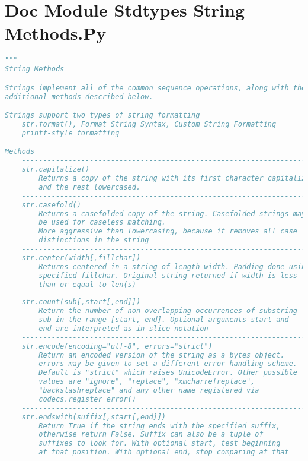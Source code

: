 \documentclass[a4paper,landscape]{report}
\begin{document}
\section{Doc Module Stdtypes String Methods.Py}
\begin{lstlisting}[language=Python]
"""
String Methods

Strings implement all of the common sequence operations, along with the
additional methods described below.

Strings support two types of string formatting
    str.format(), Format String Syntax, Custom String Formatting
    printf-style formatting

Methods
    ---------------------------------------------------------------------
    str.capitalize()
        Returns a copy of the string with its first character capitalized
        and the rest lowercased.
    ---------------------------------------------------------------------
    str.casefold()
        Returns a casefolded copy of the string. Casefolded strings may
        be used for caseless matching.
        More aggressive than lowercasing, because it removes all case
        distinctions in the string
    ---------------------------------------------------------------------
    str.center(width[,fillchar])
        Returns centered in a string of length width. Padding done using
        specified fillchar. Original string returned if width is less
        than or equal to len(s)
    ---------------------------------------------------------------------
    str.count(sub[,start[,end]])
        Return the number of non-overlapping occurrences of substring
        sub in the range [start, end]. Optional arguments start and
        end are interpreted as in slice notation
    ---------------------------------------------------------------------
    str.encode(encoding="utf-8", errors="strict")
        Return an encoded version of the string as a bytes object.
        errors may be given to set a different error handling scheme.
        Default is "strict" which raises UnicodeError. Other possible
        values are "ignore", "replace", "xmcharrefreplace",
        "backslashreplace" and any other name registered via
        codecs.register_error()
    ---------------------------------------------------------------------
    str.endswith(suffix[,start[,end]])
        Return True if the string ends with the specified suffix,
        otherwise return False. Suffix can also be a tuple of
        suffixes to look for. With optional start, test beginning
        at that position. With optional end, stop comparing at that

\end{lstlisting}
\end{document}
